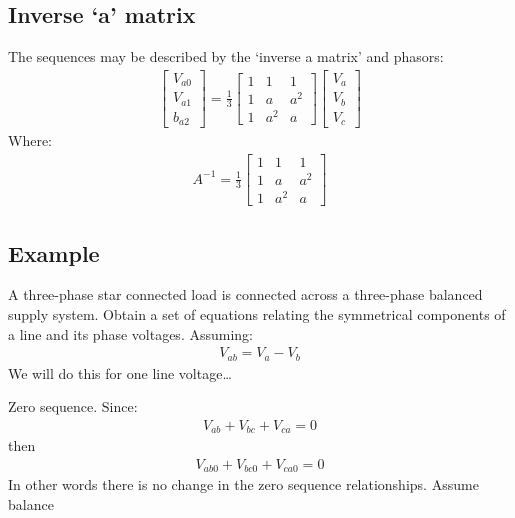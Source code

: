 \documentclass[class=report, crop=false, 12pt,a4paper]{standalone}
\begin{document}
\subsection{Inverse `a' matrix}
The sequences may be described by the `inverse a matrix' and phasors:
\begin{gather}
	\begin{bmatrix}
		V_{a0}\\
		V_{a1}\\
		b_{a2}
	\end{bmatrix} = \frac{1}{3}\begin{bmatrix}
		1 & 1 & 1\\
		1 & a & a^2\\
		1 & a^2 & a
	\end{bmatrix}\begin{bmatrix}
		V_a\\
		V_b\\
		V_c
	\end{bmatrix}
\end{gather}
Where:
\begin{gather}
	A^{-1} = \frac{1}{3}\begin{bmatrix}
		1 & 1 & 1\\
		1 & a & a^2\\
		1 & a^2 & a
	\end{bmatrix}
\end{gather}
\subsection{Example}
A three-phase star connected load is connected across a three-phase balanced supply system. Obtain a set of equations relating the symmetrical components of a line and its phase voltages. Assuming:
\begin{gather}
	V_{ab} = V_a - V_b
\end{gather}
We will do this for one line voltage\dots

Zero sequence. Since:
\begin{gather}
	V_{ab} + V_{bc} + V_{ca} = 0
\end{gather}
then
\begin{gather}
	V_{ab0} + V_{bc0} + V_{ca0} = 0
\end{gather}
In other words there is no change in the zero sequence relationships. Assume balance
\end{document}
